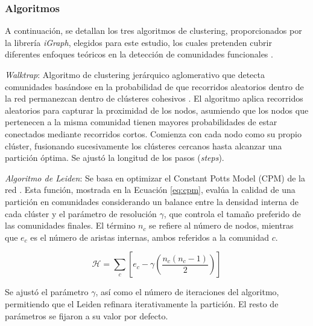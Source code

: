\subsubsection*{Algoritmos}

A continuación, se detallan los tres algoritmos de clustering, proporcionados por la librería \textit{iGraph}, elegidos para este estudio, los cuales pretenden cubrir diferentes enfoques teóricos en la detección de comunidades funcionales \cite{igraph}.  

\textit{Walktrap}: Algoritmo de clustering jerárquico aglomerativo que detecta comunidades basándose en la probabilidad de que recorridos aleatorios dentro de la red permanezcan dentro de clústeres cohesivos \cite{pons2005walktrap}. El algoritmo aplica recorridos aleatorios para capturar la proximidad de los nodos, asumiendo que los nodos que pertenecen a la misma comunidad tienen mayores probabilidades de estar conectados mediante recorridos cortos. Comienza con cada nodo como su propio clúster, fusionando sucesivamente los clústeres cercanos hasta alcanzar una partición óptima. Se ajustó la longitud de los pasos (\textit{steps}).

\textit{Algoritmo de Leiden}: Se basa en optimizar el Constant Potts Model (CPM) de la red \cite{traag2019leiden,constantplottsmodel}. Esta función, mostrada en la Ecuación \ref{eq:cpm}, evalúa la calidad de una partición en comunidades considerando un balance entre la densidad interna de cada clúster y el parámetro de resolución \(\gamma\), que controla el tamaño preferido de las comunidades finales. El término \(n_c\) se refiere al número de nodos, mientras que \(e_c\) es el número de aristas internas, ambos referidos a la comunidad \(c\).

\begin{equation}
	\label{eq:cpm}
	\mathcal{H} = \sum_{c} \left[ e_c - \gamma \left( \frac{n_c (n_c - 1)}{2} \right) \right]
\end{equation}

\noindent Se ajustó el parámetro \(\gamma\), así como el número de iteraciones del algoritmo, permitiendo que el Leiden refinara iterativamente la partición. El resto de parámetros se fijaron a su valor por defecto. 



